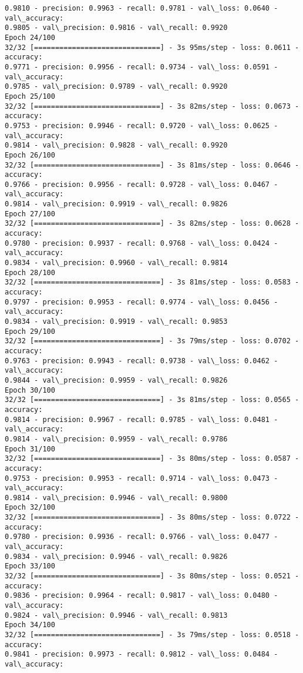 \documentclass[11pt]{article}
\begin{document}
\begin{Verbatim}[commandchars=\\\{\}]
0.9810 - precision: 0.9963 - recall: 0.9781 - val\_loss: 0.0640 - val\_accuracy:
0.9805 - val\_precision: 0.9816 - val\_recall: 0.9920
Epoch 24/100
32/32 [==============================] - 3s 95ms/step - loss: 0.0611 - accuracy:
0.9771 - precision: 0.9956 - recall: 0.9734 - val\_loss: 0.0591 - val\_accuracy:
0.9785 - val\_precision: 0.9789 - val\_recall: 0.9920
Epoch 25/100
32/32 [==============================] - 3s 82ms/step - loss: 0.0673 - accuracy:
0.9753 - precision: 0.9946 - recall: 0.9720 - val\_loss: 0.0625 - val\_accuracy:
0.9814 - val\_precision: 0.9828 - val\_recall: 0.9920
Epoch 26/100
32/32 [==============================] - 3s 81ms/step - loss: 0.0646 - accuracy:
0.9766 - precision: 0.9956 - recall: 0.9728 - val\_loss: 0.0467 - val\_accuracy:
0.9814 - val\_precision: 0.9919 - val\_recall: 0.9826
Epoch 27/100
32/32 [==============================] - 3s 82ms/step - loss: 0.0628 - accuracy:
0.9780 - precision: 0.9937 - recall: 0.9768 - val\_loss: 0.0424 - val\_accuracy:
0.9834 - val\_precision: 0.9960 - val\_recall: 0.9814
Epoch 28/100
32/32 [==============================] - 3s 81ms/step - loss: 0.0583 - accuracy:
0.9797 - precision: 0.9953 - recall: 0.9774 - val\_loss: 0.0456 - val\_accuracy:
0.9834 - val\_precision: 0.9919 - val\_recall: 0.9853
Epoch 29/100
32/32 [==============================] - 3s 79ms/step - loss: 0.0702 - accuracy:
0.9763 - precision: 0.9943 - recall: 0.9738 - val\_loss: 0.0462 - val\_accuracy:
0.9844 - val\_precision: 0.9959 - val\_recall: 0.9826
Epoch 30/100
32/32 [==============================] - 3s 81ms/step - loss: 0.0565 - accuracy:
0.9814 - precision: 0.9967 - recall: 0.9785 - val\_loss: 0.0481 - val\_accuracy:
0.9814 - val\_precision: 0.9959 - val\_recall: 0.9786
Epoch 31/100
32/32 [==============================] - 3s 80ms/step - loss: 0.0587 - accuracy:
0.9753 - precision: 0.9953 - recall: 0.9714 - val\_loss: 0.0473 - val\_accuracy:
0.9814 - val\_precision: 0.9946 - val\_recall: 0.9800
Epoch 32/100
32/32 [==============================] - 3s 80ms/step - loss: 0.0722 - accuracy:
0.9780 - precision: 0.9936 - recall: 0.9766 - val\_loss: 0.0477 - val\_accuracy:
0.9834 - val\_precision: 0.9946 - val\_recall: 0.9826
Epoch 33/100
32/32 [==============================] - 3s 80ms/step - loss: 0.0521 - accuracy:
0.9836 - precision: 0.9964 - recall: 0.9817 - val\_loss: 0.0480 - val\_accuracy:
0.9824 - val\_precision: 0.9946 - val\_recall: 0.9813
Epoch 34/100
32/32 [==============================] - 3s 79ms/step - loss: 0.0518 - accuracy:
0.9841 - precision: 0.9973 - recall: 0.9812 - val\_loss: 0.0484 - val\_accuracy:

\end{Verbatim}
\end{document}
